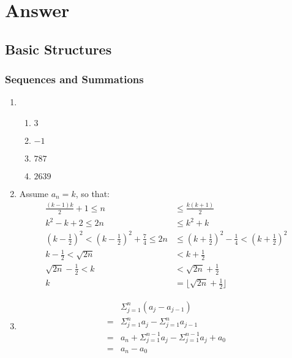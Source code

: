 \documentclass{../../cls/sig-alternate-05-2015}
\begin{document}
\nocite{*}

 
\clearpage
\appendix
\section{Answer}
\subsection{Basic Structures}
\subsubsection{Sequences and Summations}
\begin{enumerate}
\item \begin{enumerate}
    \item $3$
    \item $-1$
    \item $787$
    \item $2639$
\end{enumerate}
    
\item Assume $a_n = k$, so that:
\begin{align}
    \frac{(k - 1)k}{2} + 1 \le n & \le \frac{k(k + 1)}{2}\\
    k^2 - k + 2 \le 2n & \le k^2 + k\\
    (k - \frac{1}{2})^2 < (k - \frac{1}{2})^2 + \frac{7}{4} \le 2n & \le (k + \frac{1}{2})^2 - \frac{1}{4} < (k + \frac{1}{2})^2\\
    k - \frac{1}{2} < \sqrt{2n} & < k + \frac{1}{2}\\
    \sqrt{2n} - \frac{1}{2} < k & < \sqrt{2n} + \frac{1}{2}\\
    k & = \lfloor \sqrt{2n} + \frac{1}{2} \rfloor
\end{align}

\item 
\begin{align}
    & \Sigma^n_{j = 1}(a_j - a_{j - 1})\\
    = & \Sigma^n_{j = 1}a_j - \Sigma^n_{j = 1}a_{j - 1}\\
    = & a_n + \Sigma^{n - 1}_{j = 1}a_j - \Sigma^{n - 1}_{j = 1}a_j + a_0\\
    = & a_n - a_0
\end{align}


\end{enumerate}
\end{document}

